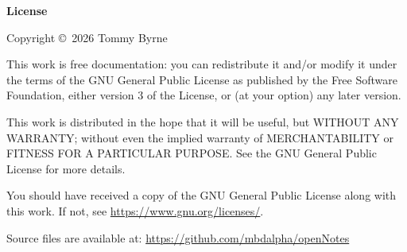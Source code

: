 \documentclass[a4paper, 10pt]{article}
\begin{document}
\bigskip

\begin{center}
\bigskip
\Large\bfseries License
\end{center}

\bigskip

Copyright \copyright\ 2026 Tommy Byrne

\bigskip

This work is free documentation: you can redistribute it and/or modify
it under the terms of the GNU General Public License as published by
the Free Software Foundation, either version 3 of the License, or
(at your option) any later version.

\bigskip

This work is distributed in the hope that it will be useful,
but WITHOUT ANY WARRANTY; without even the implied warranty of
MERCHANTABILITY or FITNESS FOR A PARTICULAR PURPOSE. See the
GNU General Public License for more details.

\bigskip

You should have received a copy of the GNU General Public License
along with this work. If not, see
\url{https://www.gnu.org/licenses/}.

\bigskip

Source files are available at:
\url{https://github.com/mbdalpha/openNotes}
\end{document}
